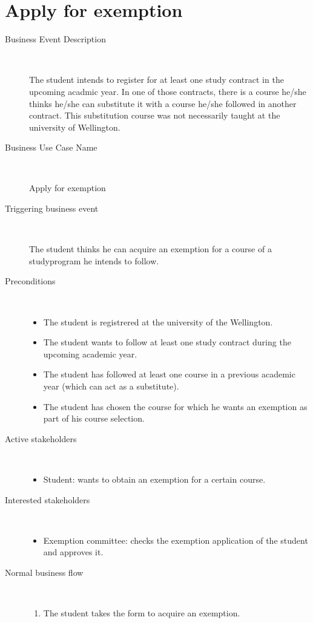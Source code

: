 \section{Apply for exemption}

\begin{description}
	\item[Business Event Description] \ 
		\par The student intends to register for at least one study contract in the
		upcoming acadmic year. In one of those contracts, there is a course he/she
		thinks he/she can substitute it with a course he/she followed in another
		contract. This substitution course was not necessarily taught at the
		university of Wellington.
	\item[Business Use Case Name] \ 
		\par Apply for exemption
	\item[Triggering business event] \ 
		\par The student thinks he can acquire an exemption for a course of a
		studyprogram he intends to follow.
	\item[Preconditions] \
	\begin{itemize}
		\item The student is registrered at the university of the Wellington.
		\item The student wants to follow at least one study contract during the
		upcoming academic year. 
		\item The student has followed at least one course in a previous academic year
		(which can act as a substitute).
		\item The student has chosen the course for which he wants an exemption as part 
		of his course selection.
	\end{itemize}
	\item[Active stakeholders] \ 
	\begin{itemize}
		\item Student: wants to obtain an exemption for a certain course.
	\end{itemize}
	\item[Interested stakeholders] \ 
		\begin{itemize}
		\item Exemption committee: checks the exemption application of the student
		and approves it.
		\end{itemize}
	\item[Normal business flow] \ 
	\begin{enumerate}
	  	\item The student takes the form to acquire an exemption.

\end{enumerate}
\end{description}

